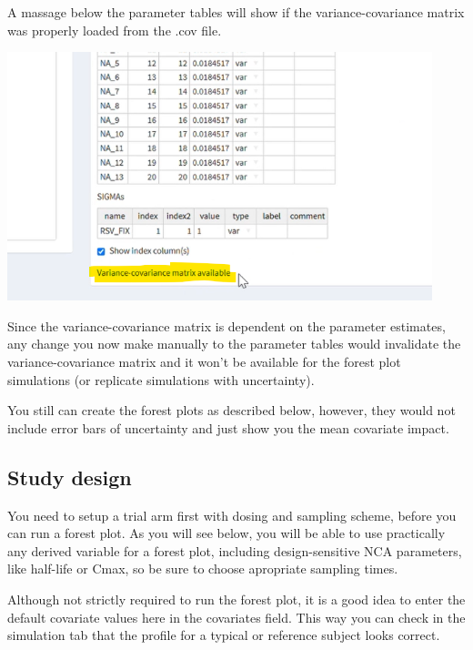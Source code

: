 \documentclass[
]{book}
\begin{document}
A massage below the parameter tables will show if the variance-covariance matrix was properly loaded from the .cov file.

\includegraphics[width=4.86458in,height=\textheight]{pictures/cov_message.png}

Since the variance-covariance matrix is dependent on the parameter estimates, any change you now make manually to the parameter tables would invalidate the variance-covariance matrix and it won't be available for the forest plot simulations (or replicate simulations with uncertainty).

You still can create the forest plots as described below, however, they would not include error bars of uncertainty and just show you the mean covariate impact.

\subsection{Study design}\label{study-design}

You need to setup a trial arm first with dosing and sampling scheme, before you can run a forest plot. As you will see below, you will be able to use practically any derived variable for a forest plot, including design-sensitive NCA parameters, like half-life or Cmax, so be sure to choose apropriate sampling times.

Although not strictly required to run the forest plot, it is a good idea to enter the default covariate values here in the covariates field. This way you can check in the simulation tab that the profile for a typical or reference subject looks correct.
\end{document}
